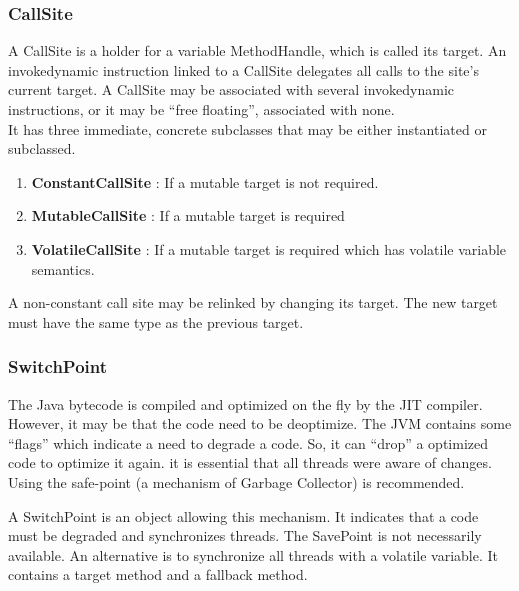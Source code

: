 \documentclass{sigplanconf}
\def \JVM{JVM\xspace}
\begin{document}
      \subsubsection{CallSite}
        A CallSite is a holder for a variable MethodHandle, which is called its target.
        An invokedynamic instruction linked to a CallSite delegates all calls to the site's current target.
        A CallSite may be associated with several invokedynamic instructions,
        or it may be ``free floating'', associated with none.\\

        It has three immediate, concrete subclasses that may be either instantiated or subclassed.
        \begin{enumerate}
          \item \textbf{ConstantCallSite} : If a mutable target is not required.
          \item \textbf{MutableCallSite}  : If a mutable target is required
          \item \textbf{VolatileCallSite} : If a mutable target is required which has volatile variable semantics.
        \end{enumerate}
        A non-constant call site may be relinked by changing its target.
        The new target must have the same type as the previous target.

      \subsubsection{SwitchPoint}
        The Java bytecode is compiled and optimized on the fly by the JIT compiler.
        However, it may be that the code need to be deoptimize.
        The \JVM contains some ``flags'' which indicate a need to degrade a code.
        So, it can ``drop'' a optimized code to optimize it again.
        it is essential that all threads were aware of changes.
        Using the safe-point (a mechanism of Garbage Collector) is recommended.

        A SwitchPoint is an object allowing this mechanism.
        It indicates that a code must be degraded and synchronizes threads.
        The SavePoint is not necessarily available.
        An alternative is to synchronize all threads with a volatile variable.
        It contains a target method and a fallback method.
        
\end{document}
